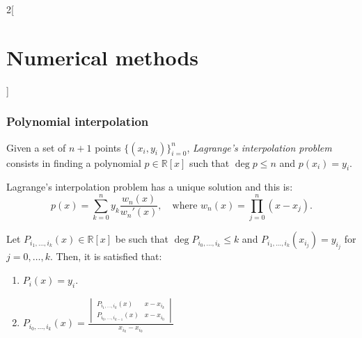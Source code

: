 \documentclass[class=article,10pt,crop=false]{standalone}
\begin{document}
\begin{multicols}{2}[\section{Numerical methods}]
\subsubsection*{Polynomial interpolation}
\begin{definition}
Given a set of $n+1$ points $\{(x_i,y_i)\}_{i=0}^n$, \textit{Lagrange's interpolation problem} consists in finding a polynomial $p\in\mathbb{R}[x]$ such that $\deg p\leq n$ and $p(x_i)=y_i$.
\end{definition}
\begin{prop}
Lagrange's interpolation problem has a unique solution and this is: $$p(x)=\sum_{k=0}^ny_k\frac{w_n(x)}{w_n'(x)},\quad\text{where }w_n(x)=\prod_{j=0}^n(x-x_j).$$
\end{prop}
\begin{prop}
Let $P_{i_1,\ldots,i_k}(x)\in\mathbb{R}[x]$ be such that $\deg P_{i_0,\ldots,i_k}\leq k$ and $P_{i_1,\ldots,i_k}(x_{i_j})=y_{i_j}$ for $j=0,\ldots,k$. Then, it is satisfied that:
\begin{enumerate}
    \item $P_i(x)=y_i$.
    \item $P_{i_0,\ldots,i_k}(x)=\frac{\begin{vmatrix}
    P_{i_1,\ldots,i_k}(x) & x-x_{i_k}\\
    P_{i_0,\ldots,i_{k-1}}(x) & x-x_{i_0}
    \end{vmatrix}}{x_{i_k}-x_{i_0}}$
\end{enumerate}
\end{prop}
\end{multicols}
\end{document}
